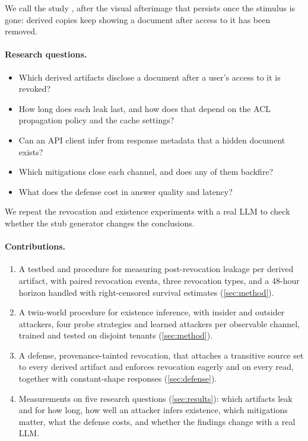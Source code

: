 We call the study \sys, after the visual afterimage that persists once the stimulus is gone: derived copies keep showing a document after access to it has been removed.

\paragraph{Research questions.}
\begin{itemize}
\item[RQ1] Which derived artifacts disclose a document after a user's access to it is revoked?
\item[RQ2] How long does each leak last, and how does that depend on the ACL propagation policy and the cache settings?
\item[RQ3] Can an API client infer from response metadata that a hidden document exists?
\item[RQ4] Which mitigations close each channel, and does any of them backfire?
\item[RQ5] What does the defense cost in answer quality and latency?
\end{itemize}
We repeat the revocation and existence experiments with a real LLM to check whether the stub generator changes the conclusions.

\paragraph{Contributions.}
\begin{enumerate}
\item A testbed and procedure for measuring post-revocation leakage per derived artifact, with paired revocation events, three revocation types, and a 48-hour horizon handled with right-censored survival estimates (\cref{sec:method}).
\item A twin-world procedure for existence inference, with insider and outsider attackers, four probe strategies and learned attackers per observable channel, trained and tested on disjoint tenants (\cref{sec:method}).
\item A defense, provenance-tainted revocation, that attaches a transitive source set to every derived artifact and enforces revocation eagerly and on every read, together with constant-shape responses (\cref{sec:defense}).
\item Measurements on five research questions (\cref{sec:results}): which artifacts leak and for how long, how well an attacker infers existence, which mitigations matter, what the defense costs, and whether the findings change with a real LLM.
\end{enumerate}

